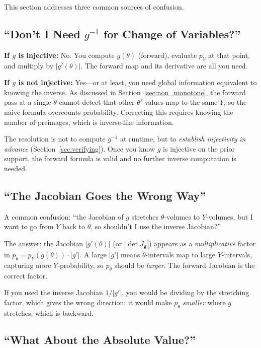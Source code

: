 \documentclass[11pt,a4paper]{article}
\theoremstyle{definition}
\begin{document}
This section addresses three common sources of confusion.

\subsection{``Don't I Need \texorpdfstring{$g^{-1}$}{the inverse} for Change of Variables?''}

\textbf{If $g$ is injective:} No. You compute $g(\theta)$ (forward), evaluate
$p_Y$ at that point, and multiply by $|g'(\theta)|$. The forward map and its
derivative are all you need.

\textbf{If $g$ is not injective:} Yes---or at least, you need global
information equivalent to knowing the inverse. As discussed in
Section~\ref{sec:non_monotone}, the forward pass at a single $\theta$ cannot
detect that other $\theta'$ values map to the same $Y$, so the naive formula
overcounts probability. Correcting this requires knowing the number of
preimages, which is inverse-like information.

The resolution is not to compute $g^{-1}$ at runtime, but to \emph{establish
injectivity in advance} (Section~\ref{sec:verifying}). Once you know $g$ is
injective on the prior support, the forward formula is valid and no further
inverse computation is needed.

\subsection{``The Jacobian Goes the Wrong Way''}

A common confusion: ``the Jacobian of $g$ stretches $\theta$-volumes to
$Y$-volumes, but I want to go from $Y$ back to $\theta$, so shouldn't I use
the inverse Jacobian?''

The answer: the Jacobian $|g'(\theta)|$ (or $|\!\det J_{\mathbf{g}}|$) appears
as a \emph{multiplicative} factor in $p_\theta = p_Y(g(\theta)) \cdot |g'|$.
A large $|g'|$ means $\theta$-intervals map to large $Y$-intervals, capturing
more $Y$-probability, so $p_\theta$ should be \emph{larger}. The forward
Jacobian is the correct factor.

If you used the inverse Jacobian $1/|g'|$, you would be dividing by the
stretching factor, which gives the wrong direction: it would make $p_\theta$
\emph{smaller} where $g$ stretches, which is backward.

\subsection{``What About the Absolute Value?''}
\end{document}
